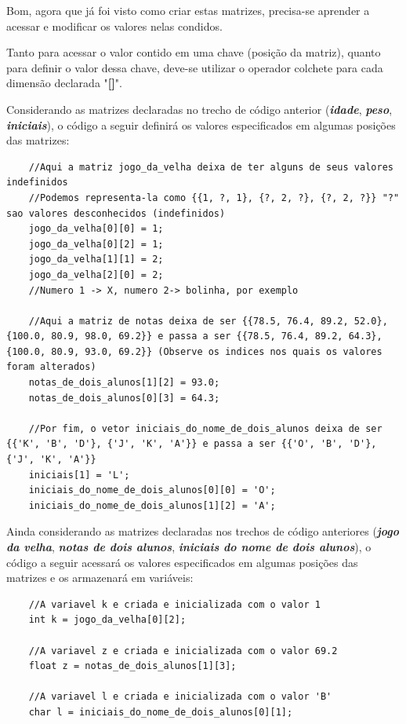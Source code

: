 \documentclass[12pt]{article}
\newcommand\tab[1][1cm]{\hspace*{#1}}
\begin{document}
\par\tab Bom, agora que já foi visto como criar estas matrizes, precisa-se aprender a acessar e modificar os valores nelas condidos.

\par\tab Tanto para acessar o valor contido em uma chave (posição da matriz), quanto para definir o valor dessa chave, deve-se utilizar o operador colchete para cada dimensão declarada "\textbf{[]}".

\par\tab Considerando as matrizes declaradas no trecho de código anterior (\textbf{\textit{idade}}, \textbf{\textit{peso}}, \textbf{\textit{iniciais}}), o código a seguir definirá os valores especificados em algumas posições das matrizes:

\hspace{0.25cm}
\begin{lstlisting}
    //Aqui a matriz jogo_da_velha deixa de ter alguns de seus valores indefinidos
    //Podemos representa-la como {{1, ?, 1}, {?, 2, ?}, {?, 2, ?}} "?" sao valores desconhecidos (indefinidos)
    jogo_da_velha[0][0] = 1;
    jogo_da_velha[0][2] = 1;
    jogo_da_velha[1][1] = 2;
    jogo_da_velha[2][0] = 2;
    //Numero 1 -> X, numero 2-> bolinha, por exemplo
    
    //Aqui a matriz de notas deixa de ser {{78.5, 76.4, 89.2, 52.0}, {100.0, 80.9, 98.0, 69.2}} e passa a ser {{78.5, 76.4, 89.2, 64.3}, {100.0, 80.9, 93.0, 69.2}} (Observe os indices nos quais os valores foram alterados)
    notas_de_dois_alunos[1][2] = 93.0;
    notas_de_dois_alunos[0][3] = 64.3;
    
    //Por fim, o vetor iniciais_do_nome_de_dois_alunos deixa de ser {{'K', 'B', 'D'}, {'J', 'K', 'A'}} e passa a ser {{'O', 'B', 'D'}, {'J', 'K', 'A'}}
    iniciais[1] = 'L';
    iniciais_do_nome_de_dois_alunos[0][0] = 'O';
    iniciais_do_nome_de_dois_alunos[1][2] = 'A';
\end{lstlisting}

\par\tab Ainda considerando as matrizes declaradas nos trechos de código anteriores (\textbf{\textit{jogo da velha}}, \textbf{\textit{notas de dois alunos}}, \textbf{\textit{iniciais do nome de dois alunos}}), o código a seguir acessará os valores especificados em algumas posições das matrizes e os armazenará em variáveis:

\hspace{0.25cm}
\begin{lstlisting}
    //A variavel k e criada e inicializada com o valor 1
    int k = jogo_da_velha[0][2];
    
    //A variavel z e criada e inicializada com o valor 69.2
    float z = notas_de_dois_alunos[1][3];
    
    //A variavel l e criada e inicializada com o valor 'B'
    char l = iniciais_do_nome_de_dois_alunos[0][1];
\end{lstlisting}
\end{document}
